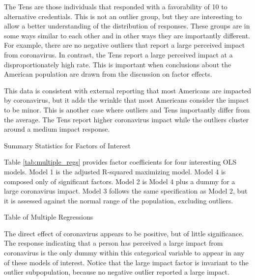 \documentclass[review]{elsarticle}
\begin{document}
The Tens are those individuals that responded with a favorability of 10 to alternative credentials.
This is not an outlier group, but they are interesting to allow a better understanding of the distribution of responses.
These groups are in some ways similar to each other and in other ways they are importantly different.
For example, there are no negative outliers that report a large perceived impact from coronavirus.
In contrast, the Tens report a large perceived impact at a disproportionately high rate.
This is important when conclusions about the American population are drawn from the discussion on factor effects.

This data is consistent with external reporting that most Americans are impacted by coronavirus\cite{demographic2020},
but it adds the wrinkle that most Americans consider the impact to be minor.
This is another case where outliers and Tens importantly differ from the average.
The Tens report higher coronavirus impact while the outliers cluster around a medium impact response.

\begin{table}
    \caption{Summary Statistics for Factors of Interest}
    \resizebox{\columnwidth}{!}{
        
    }
    \label{tab:desc_stats}
\end{table}

Table \ref{tab:multiple_regs} provides factor coefficients for four interesting OLS models.
Model 1 is the adjusted R-squared maximizing model.
Model 4 is composed only of significant factors.
Model 2 is Model 4 plus a dummy for a large coronavirus impact.
Model 3 follows the same specification as Model 2,
but it is assessed against the normal range of the population, excluding outliers.

\begin{table}
    \caption{Table of Multiple Regressions}
    \resizebox{\columnwidth}{!}{
        
    }
    \label{tab:multiple_regs}
\end{table}

The direct effect of coronavirus appears to be positive, but of little significance.
The response indicating that a person has perceived a large impact from coronavirus is the only dummy
within this categorical variable to appear in any of these models of interest.
Notice that the large impact factor is invariant to the outlier subpopulation,
because no negative outlier reported a large impact.
\end{document}
